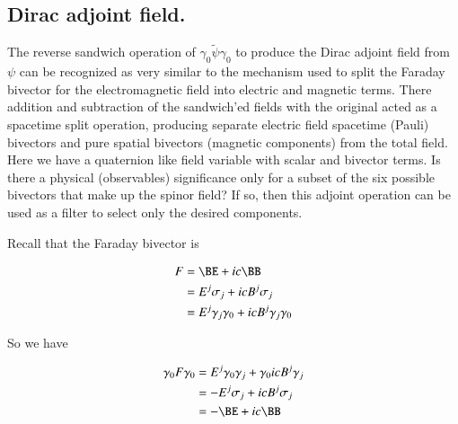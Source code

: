 \subsection{Dirac adjoint field. }


The reverse sandwich operation of $\gamma_0 \tilde{\psi} \gamma_0$ to produce the Dirac adjoint field from $\psi$ 
can be recognized 
as very similar to the mechanism used to split the Faraday bivector for the electromagnetic field into electric and magnetic terms.  There addition and subtraction of the sandwich'ed fields with the original acted as a spacetime split operation, producing separate electric field spacetime (Pauli) bivectors and pure spatial bivectors (magnetic components) from the total field.  Here we have a
quaternion like field variable with scalar and bivector terms.  Is there a physical (observables) significance 
only for a subset of the six possible bivectors that make up the spinor field?
If so, then this adjoint operation can be used as a filter to select only the desired components.

Recall that the Faraday bivector is

\begin{align*}
F 
&= \BE + i c \BB \\
&= E^j \sigma_j + i c B^j \sigma_j \\
&= E^j \gamma_j \gamma_0 + i c B^j \gamma_j \gamma_0 \\
\end{align*}

So we have

\begin{align*}
\gamma_0 F \gamma_0
&= E^j \gamma_0 \gamma_j + \gamma_0 i c B^j \gamma_j \\
&= -E^j \sigma_j + i c B^j \sigma_j \\
&= -\BE + i c \BB
\end{align*}

